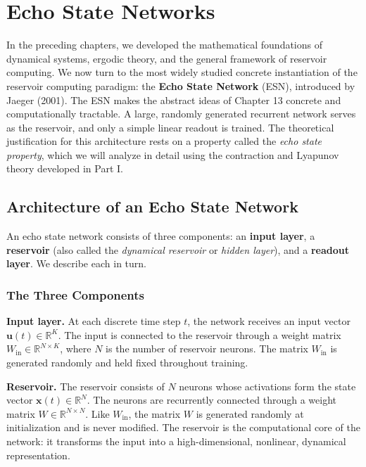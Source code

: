 \chapter{Echo State Networks}\label{ch:14}

In the preceding chapters, we developed the mathematical foundations of dynamical systems, ergodic theory, and the general framework of reservoir computing. We now turn to the most widely studied concrete instantiation of the reservoir computing paradigm: the \textbf{Echo State Network} (ESN), introduced by Jaeger (2001). The ESN makes the abstract ideas of Chapter 13 concrete and computationally tractable. A large, randomly generated recurrent network serves as the reservoir, and only a simple linear readout is trained. The theoretical justification for this architecture rests on a property called the \textit{echo state property}, which we will analyze in detail using the contraction and Lyapunov theory developed in Part I.


\bigskip


\section{Architecture of an Echo State Network}\label{sec:14.1}

An echo state network consists of three components: an \textbf{input layer}, a \textbf{reservoir} (also called the \textit{dynamical reservoir} or \textit{hidden layer}), and a \textbf{readout layer}. We describe each in turn.

\subsection{The Three Components}\label{sec:14.1.1}

\textbf{Input layer.} At each discrete time step $t$, the network receives an input vector $\mathbf{u}(t) \in \mathbb{R}^K$. The input is connected to the reservoir through a weight matrix $W_{\text{in}} \in \mathbb{R}^{N \times K}$, where $N$ is the number of reservoir neurons. The matrix $W_{\text{in}}$ is generated randomly and held fixed throughout training.

\textbf{Reservoir.} The reservoir consists of $N$ neurons whose activations form the state vector $\mathbf{x}(t) \in \mathbb{R}^N$. The neurons are recurrently connected through a weight matrix $W \in \mathbb{R}^{N \times N}$. Like $W_{\text{in}}$, the matrix $W$ is generated randomly at initialization and is never modified. The reservoir is the computational core of the network: it transforms the input into a high-dimensional, nonlinear, dynamical representation.

